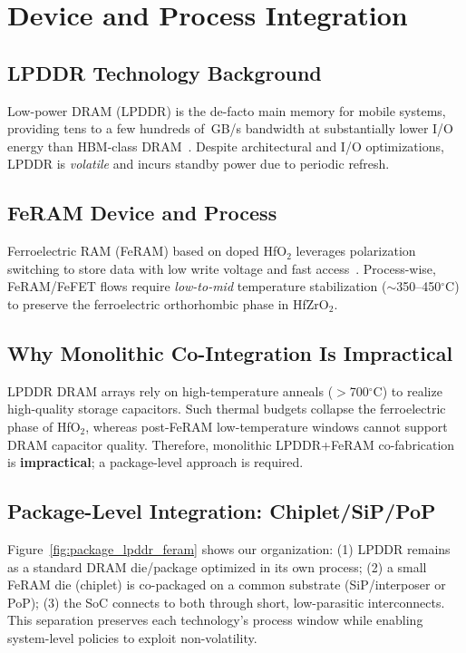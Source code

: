 \section{Device and Process Integration}

\subsection{LPDDR Technology Background}
Low-power DRAM (LPDDR) is the de-facto main memory for mobile systems, providing tens to a few hundreds of~GB/s bandwidth
at substantially lower I/O energy than HBM-class DRAM~\cite{ChoiIEDM2022}.
Despite architectural and I/O optimizations, LPDDR is \emph{volatile} and incurs standby power due to periodic refresh.



\subsection{FeRAM Device and Process}
Ferroelectric RAM (FeRAM) based on doped HfO$_2$ leverages polarization switching to store data with low write voltage and fast access~\cite{MullerAPL2011,KimIEDM2021,NohedaNRM2023}.
Process-wise, FeRAM/FeFET flows require \emph{low-to-mid} temperature stabilization ($\sim$350--450$^\circ$C) to preserve the ferroelectric orthorhombic phase in HfZrO$_2$.

\subsection{Why Monolithic Co-Integration Is Impractical}
LPDDR DRAM arrays rely on high-temperature anneals ($>$700$^\circ$C) to realize high-quality storage capacitors.
Such thermal budgets collapse the ferroelectric phase of HfO$_2$, whereas post-FeRAM low-temperature windows cannot support DRAM capacitor quality.
Therefore, monolithic LPDDR+FeRAM co-fabrication is \textbf{impractical}; a package-level approach is required.

\subsection{Package-Level Integration: Chiplet/SiP/PoP}
Figure~\ref{fig:package_lpddr_feram} shows our organization:
(1) LPDDR remains as a standard DRAM die/package optimized in its own process;
(2) a small FeRAM die (chiplet) is co-packaged on a common substrate (SiP/interposer or PoP);
(3) the SoC connects to both through short, low-parasitic interconnects.
This separation preserves each technology's process window while enabling system-level policies to exploit non-volatility.

